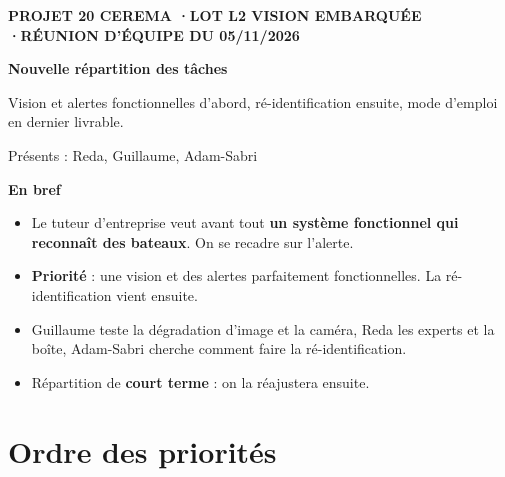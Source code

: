 \documentclass[10pt,a4paper]{article}
\begin{document}
\RaggedRight

{\scriptsize\bfseries\color{muted} PROJET 20 CEREMA \quad·\quad LOT L2 VISION EMBARQUÉE \quad·\quad RÉUNION D'ÉQUIPE DU 05/11/2026\par}
\vspace{0.5em}
{\fontsize{21}{24}\selectfont\bfseries\color{cDec} Nouvelle répartition des tâches\par}
\vspace{0.25em}
{\color{muted} Vision et alertes fonctionnelles d'abord, ré-identification ensuite, mode d'emploi en dernier livrable.\par}
\vspace{0.2em}
{\footnotesize\color{muted} Présents : Reda, Guillaume, Adam-Sabri\par}

\begin{tcolorbox}[enhanced, colback=cDec!4, colframe=cDec!4, arc=6pt, left=10pt, right=10pt, top=7pt, bottom=7pt]
{\small\bfseries\color{cDec} En bref}\par\vspace{2pt}
\begin{itemize}
  \item Le tuteur d'entreprise veut avant tout \textbf{un système fonctionnel qui reconnaît des bateaux}. On se recadre sur l'alerte.
  \item \textbf{Priorité} : une vision et des alertes parfaitement fonctionnelles. La ré-identification vient ensuite.
  \item Guillaume teste la dégradation d'image et la caméra, Reda les experts et la boîte, Adam-Sabri cherche comment faire la ré-identification.
  \item Répartition de \textbf{court terme} : on la réajustera ensuite.
\end{itemize}
\end{tcolorbox}

\section{Ordre des priorités}
\end{document}
